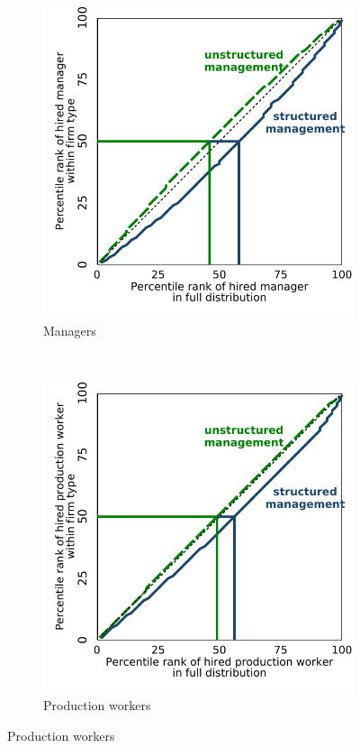 \clearpage
	\begin{figure}[h]
		\centering
		\caption{Quality distribution of newly hired managers and production workers}
		\label{fig:hiring_lorenz}
		\begin{subfigure}[b]{1\textwidth}
		  \centering
		  \caption{Managers}
		  \includegraphics{./exhibits/fig_hiring_lorenz_mngr}
		\end{subfigure}
		\ \\
		\begin{subfigure}[b]{1\textwidth}
		  \centering
		   \caption{Production workers}
		  \includegraphics{./exhibits/fig_hiring_lorenz_labr}
		\end{subfigure}
		
	\end{figure}

